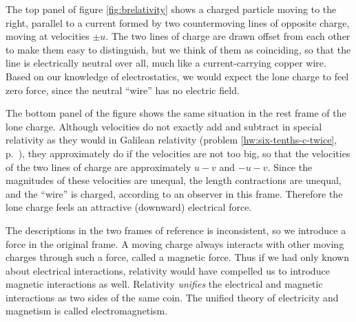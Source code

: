 The top panel of figure \ref{fig:brelativity} shows a charged particle
moving to the right, parallel to a current formed by two countermoving
lines of opposite charge, moving at velocities $\pm u$. The two lines
of charge are drawn offset from each other to make them easy to
distinguish, but we think of them as coinciding, so that the line is
electrically neutral over all, much like a current-carrying copper
wire. Based on our knowledge of electrostatics, we would expect the
lone charge to feel zero force, since the neutral ``wire'' has no
electric field. 



The bottom panel of the figure shows the same situation in the rest
frame of the lone charge. Although velocities do not exactly add and
subtract in special relativity as they would in Galilean relativity
(problem \ref{hw:six-tenths-c-twice},
p.~\pageref{hw:six-tenths-c-twice}), they approximately do if the
velocities are not too big, so that the velocities of the two lines of
charge are approximately $u-v$ and $-u-v$. Since the magnitudes of
these velocities are unequal, the length contractions are unequal, and
the ``wire'' is charged, according to an observer in this frame.
Therefore the lone charge feels an attractive (downward) electrical
force.

The descriptions in the two frames of reference is inconsistent, so we
introduce a force in the original frame.  A moving charge always
interacts with other moving charges through such a force, called a
magnetic force. Thus if we had only known about electrical
interactions, relativity would have compelled us to introduce magnetic
interactions as well. Relativity \emph{unifies} the electrical and
magnetic interactions as two sides of the same coin. The unified
theory of electricity and magnetism is called electromagnetism.


